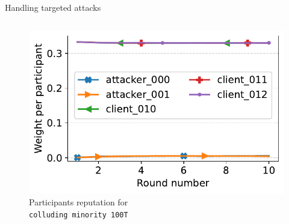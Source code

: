 \begin{frame}{Handling targeted attacks}
\begin{columns}
\begin{column}{.6\textwidth}
    \begin{minipage}[t][0.65\textheight]{\textwidth}
        \begin{figure}
            \captionsetup{justification=centering}
                \includegraphics[width=0.65\linewidth]{./figures/eval/reput/byzantine_minority_loud_expanded.pdf}
                \caption{Participants reputation for\\
                \texttt{colluding minority 100T}}
      \end{figure}
    \end{minipage}  

  
         \end{column}
  \end{columns}
\end{frame}
